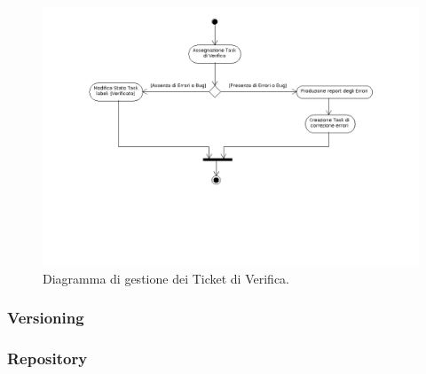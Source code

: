 \documentclass[12pt,a4paper]{article}
\begin{document}
\begin{center}
\begin{figure}[h]
\centering
\label{f2-Ticket Verifica}
\includegraphics[scale=0.5]{ticketVerifica.png}
\caption{Diagramma di gestione dei Ticket di Verifica.}
\end{figure}
\end{center}

\subsubsection{Versioning} %


\subsubsection{Repository} %

\newpage
\end{document}
